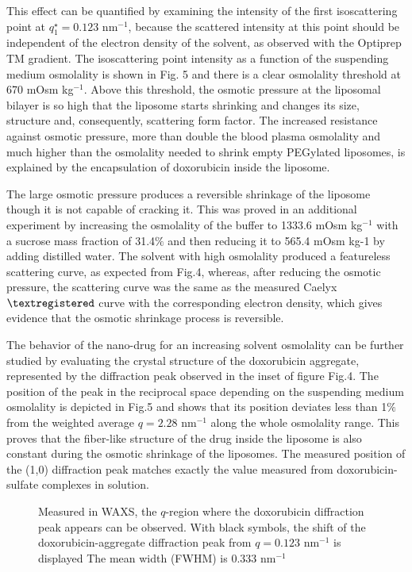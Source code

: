 This effect can be quantified by examining the intensity of the first isoscattering point at $q^{\star}_1 = 0.123$ nm$^{-1}$, because the scattered intensity at this point should be independent of the electron density of the solvent, as observed with the Optiprep TM gradient. The isoscattering point intensity as a function of the suspending medium osmolality is shown in Fig. 5 and there is a clear osmolality threshold at 670 mOsm kg$^{-1}$. Above this threshold, the osmotic pressure at the liposomal bilayer is so high that the liposome starts shrinking and changes its size, structure and, consequently, scattering form factor. The increased resistance against osmotic pressure, more than double the blood plasma osmolality and much higher than the osmolality needed to shrink empty PEGylated liposomes, is explained by the encapsulation of doxorubicin inside the liposome.

The large osmotic pressure produces a reversible shrinkage of the liposome though it is not capable of cracking it. This was proved in an additional experiment by increasing the osmolality of the buffer to 1333.6 mOsm kg$^{-1}$ with a sucrose mass fraction of 31.4$\%$ and then reducing it to 565.4 mOsm kg-1 by adding distilled water. The solvent with high osmolality produced a featureless scattering curve, as expected from Fig.4, whereas, after reducing the osmotic pressure, the scattering curve was the same as the measured Caelyx$\textregistered$ curve with the corresponding electron density, which gives evidence that the osmotic shrinkage process is reversible.

The behavior of the nano-drug for an increasing solvent osmolality can be further studied by evaluating the crystal structure of the doxorubicin aggregate, represented by the diffraction peak observed in the inset of figure Fig.4. The position of the peak in the reciprocal space depending on the suspending medium osmolality is depicted in Fig.5 and shows that its position deviates less than 1$\%$ from the weighted average $q=2.28$ nm$^{-1}$ along the whole osmolality range. This proves that the fiber-like structure of the drug inside the liposome is also constant during the osmotic shrinkage of the liposomes. The measured position of the (1,0) diffraction peak matches exactly the value measured from doxorubicin-sulfate complexes in solution.

\begin{figure}
	\centering
		\caption{Measured in WAXS, the $q$-region where the doxorubicin diffraction peak appears can be observed. With black symbols, the shift of the doxorubicin-aggregate diffraction peak from $q=0.123$ nm$^{-1}$ is displayed The mean width (FWHM) is 0.333  nm$^{-1}$}
\end{figure}

